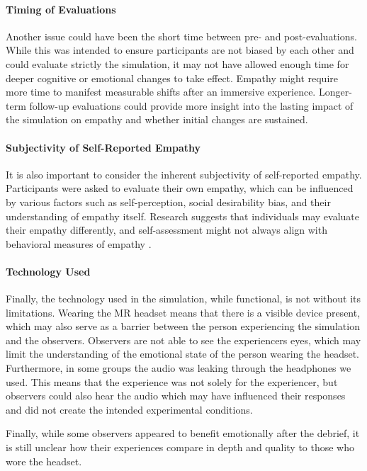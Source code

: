 \paragraph{Timing of Evaluations} Another issue could have been the short time between pre- and post-evaluations. While this was intended to ensure participants are not biased by each other and could evaluate strictly the simulation, it may not have allowed enough time for deeper cognitive or emotional changes to take effect. Empathy might require more time to manifest measurable shifts after an immersive experience. Longer-term follow-up evaluations could provide more insight into the lasting impact of the simulation on empathy and whether initial changes are sustained.

\paragraph{Subjectivity of Self-Reported Empathy} It is also important to consider the inherent subjectivity of self-reported empathy. Participants were asked to evaluate their own empathy, which can be influenced by various factors such as self-perception, social desirability bias, and their understanding of empathy itself. Research suggests that individuals may evaluate their empathy differently, and self-assessment might not always align with behavioral measures of empathy \cite{Sunahara2022}.

\paragraph{Technology Used} Finally, the technology used in the simulation, while functional, is not without its limitations. Wearing the MR headset means that there is a visible device present, which may also serve as a barrier between the person experiencing the simulation and the observers. Observers are not able to see the experiencers eyes, which may limit the understanding of the emotional state of the person wearing the headset. Furthermore, in some groups the audio was leaking through the headphones we used. This means that the experience was not solely for the experiencer, but observers could also hear the audio which may have influenced their responses and did not create the intended experimental conditions.

\vspace{1em}

Finally, while some observers appeared to benefit emotionally after the debrief, it is still unclear how their experiences compare in depth and quality to those who wore the headset. 

